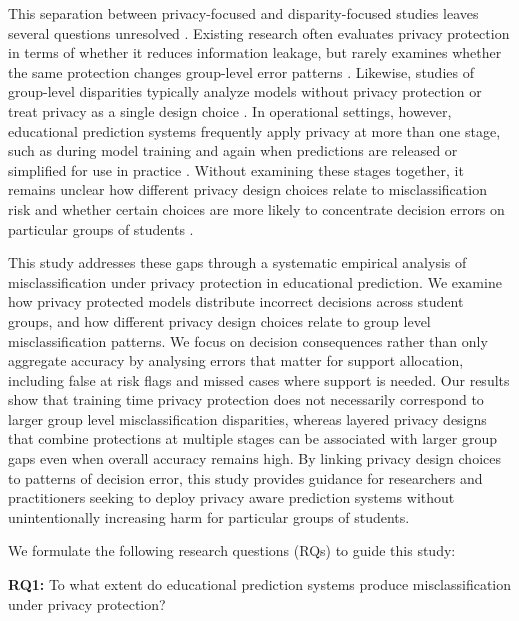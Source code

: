 \documentclass{edm_article}
\begin{document}
This separation between privacy-focused and disparity-focused studies leaves several questions unresolved \cite{1shokri2017membership,4Yeom2017PrivacyRI,21Hu2020TowardsFE,23gardner2019_abroca_slicing_fairness}. Existing research often evaluates privacy protection in terms of whether it reduces information leakage, but rarely examines whether the same protection changes group-level error patterns \cite{1shokri2017membership,4Yeom2017PrivacyRI,6Carlini9833649,10jagielski2020_auditing_dpsgd}. Likewise, studies of group-level disparities typically analyze models without privacy protection or treat privacy as a single design choice \cite{21Hu2020TowardsFE,22gu2022_privacy_accuracy_fairness_fl,23gardner2019_abroca_slicing_fairness}. In operational settings, however, educational prediction systems frequently apply privacy at more than one stage, such as during model training and again when predictions are released or simplified for use in practice \cite{9abadi2016_dpsgd,14jia2019_memguard,16chen2024hamp}. Without examining these stages together, it remains unclear how different privacy design choices relate to misclassification risk and whether certain choices are more likely to concentrate decision errors on particular groups of students \cite{18hardt2016eopp,22gu2022_privacy_accuracy_fairness_fl}.

This study addresses these gaps through a systematic empirical analysis of misclassification under privacy protection in educational prediction. We examine how privacy protected models distribute incorrect decisions across student groups, and how different privacy design choices relate to group level misclassification patterns. We focus on decision consequences rather than only aggregate accuracy by analysing errors that matter for support allocation, including false at risk flags and missed cases where support is needed. Our results show that training time privacy protection does not necessarily correspond to larger group level misclassification disparities, whereas layered privacy designs that combine protections at multiple stages can be associated with larger group gaps even when overall accuracy remains high. By linking privacy design choices to patterns of decision error, this study provides guidance for researchers and practitioners seeking to deploy privacy aware prediction systems without unintentionally increasing harm for particular groups of students.

We formulate the following research questions (RQs) to guide this study:

\textbf{RQ1:} To what extent do educational prediction systems produce misclassification under privacy protection?
\end{document}

